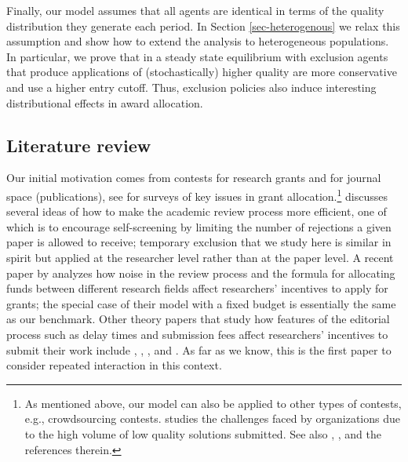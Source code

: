 \documentclass[12pt]{article}
\theoremstyle{plain}
\theoremstyle{definition}
\theoremstyle{remark}
\begin{document}
Finally, our model assumes that all agents are identical in terms of the quality distribution they generate each period. In Section \ref{sec-heterogenous} we relax this assumption and show how to extend the analysis to heterogeneous populations. In particular, we prove that in a steady state equilibrium with exclusion agents that produce applications of (stochastically) higher quality are more conservative and use a higher entry cutoff. Thus, exclusion policies also induce interesting distributional effects in award allocation.   




\subsection{Literature review}\label{subsec-lit_rev} 

Our initial motivation comes from contests for research grants and for journal space (publications), see \citet{lepori2023handbook} for surveys of key issues in grant allocation.\footnote{As mentioned above, our model can also be applied to other types of contests, e.g., crowdsourcing contests. \citet{acar2019motivations} studies the challenges faced by organizations due to the high volume of low quality solutions submitted. See also \citet{chen2021attracting}, \citet{patel2023monetary}, and the references therein.} \citet{azar2006academic} discusses several ideas of how to make the academic review process more efficient, one of which is to encourage self-screening by limiting the number of rejections a given paper is allowed to receive; temporary exclusion that we study here is similar in spirit but applied at the researcher level rather than at the paper level. A recent paper by \citet{adda2024grantmaking} analyzes how noise in the review process and the formula for allocating funds between different research fields affect researchers' incentives to apply for grants; the special case of their model with a fixed budget is essentially the same as our benchmark. Other theory papers that study how features of the editorial process such as delay times and submission fees affect researchers' incentives to submit their work include \citet{leslie2005delays}, \citet{azar2007slowdown}, \citet{cotton2013submission}, and \citet{muller2021gatekeeper}. As far as we know, this is the first paper to consider repeated interaction in this context.
\end{document}
